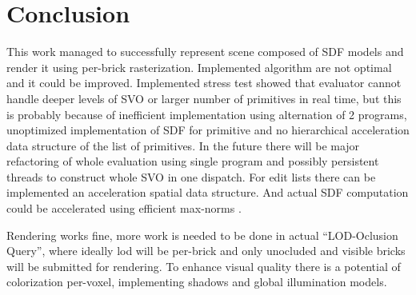 \documentclass[11pt, a4paper]{article}
\renewcommand{\uv}[1]{``#1''}
\begin{document}

\section{Conclusion}

This work managed to successfully represent scene composed of SDF models and render it using per-brick rasterization.
Implemented algorithm are not optimal and it could be improved.
Implemented stress test showed that evaluator cannot handle deeper levels of SVO or larger number of primitives in real time, but this is probably because of inefficient implementation using alternation of 2 programs, unoptimized implementation of SDF for primitive and no hierarchical acceleration data structure of the list of primitives.
In the future there will be major refactoring of whole evaluation using single program and possibly persistent threads to construct whole SVO in one dispatch. For edit lists there can be implemented an acceleration spatial data structure. And actual SDF computation could be accelerated using efficient max-norms \cite{gokul2003}.

Rendering works fine, more work is needed to be done in actual \uv{LOD-Oclusion Query}, where ideally lod will be per-brick and only unocluded and visible bricks will be submitted for rendering.
To enhance visual quality there is a potential of colorization per-voxel, implementing shadows and global illumination models.


\begin{flushleft}
  
\end{flushleft}

\end{document}
